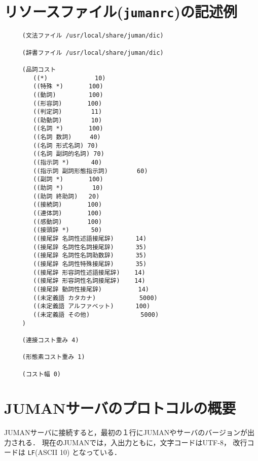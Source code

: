 \documentclass[a4j,titlepage]{jarticle}
\begin{document}
\clearpage

\section{リソースファイル({\tt jumanrc})の記述例}\label{app:option}

\begin{verbatim}
     (文法ファイル /usr/local/share/juman/dic)
 
     (辞書ファイル /usr/local/share/juman/dic)

     (品詞コスト
        ((*)             10)
        ((特殊 *)       100)
        ((動詞)         100)
        ((形容詞)       100)
        ((判定詞)        11)
        ((助動詞)        10)
        ((名詞 *)       100)
        ((名詞 数詞)     40)
        ((名詞 形式名詞) 70)
        ((名詞 副詞的名詞) 70)
        ((指示詞 *)      40)
        ((指示詞 副詞形態指示詞)        60)
        ((副詞 *)       100)
        ((助詞 *)        10)
        ((助詞 終助詞)   20)
        ((接続詞)       100)
        ((連体詞)       100)
        ((感動詞)       100)
        ((接頭辞 *)      50)
        ((接尾辞 名詞性述語接尾辞)      14)
        ((接尾辞 名詞性名詞接尾辞)      35)
        ((接尾辞 名詞性名詞助数辞)      35)
        ((接尾辞 名詞性特殊接尾辞)      35)
        ((接尾辞 形容詞性述語接尾辞)    14)
        ((接尾辞 形容詞性名詞接尾辞)    14)
        ((接尾辞 動詞性接尾辞)          14)
        ((未定義語 カタカナ)            5000)
        ((未定義語 アルファベット)      100)
        ((未定義語 その他)              5000)
     )

     (連接コスト重み 4)

     (形態素コスト重み 1)

     (コスト幅 0)
\end{verbatim}

\clearpage

\section{JUMANサーバのプロトコルの概要}\label{protocol}

JUMANサーバに接続すると，最初の１行にJUMANやサーバのバージョンが出力される．
現在のJUMANでは，入出力ともに，文字コードはUTF-8，
改行コードは {\tt LF}(ASCII 10) となっている．
\end{document}
